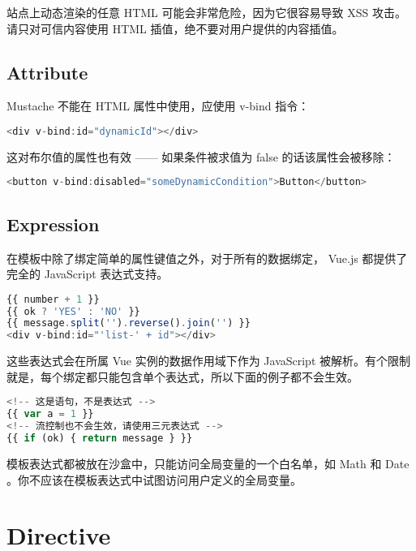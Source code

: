 站点上动态渲染的任意 HTML 可能会非常危险，因为它很容易导致 XSS 攻击。请只对可信内容使用 HTML 插值，绝不要对用户提供的内容插值。




\subsection{Attribute}

Mustache 不能在 HTML 属性中使用，应使用 v-bind 指令：

\begin{lstlisting}[language=JavaScript]
<div v-bind:id="dynamicId"></div>
\end{lstlisting}

这对布尔值的属性也有效 —— 如果条件被求值为 false 的话该属性会被移除：

\begin{lstlisting}[language=JavaScript]
<button v-bind:disabled="someDynamicCondition">Button</button>
\end{lstlisting}





\subsection{Expression}

在模板中除了绑定简单的属性键值之外，对于所有的数据绑定， Vue.js 都提供了完全的 JavaScript 表达式支持。

\begin{lstlisting}[language=JavaScript]
{{ number + 1 }}
{{ ok ? 'YES' : 'NO' }}
{{ message.split('').reverse().join('') }}
<div v-bind:id="'list-' + id"></div>
\end{lstlisting}


这些表达式会在所属 Vue 实例的数据作用域下作为 JavaScript 被解析。有个限制就是，每个绑定都只能包含单个表达式，所以下面的例子都不会生效。

\begin{lstlisting}[language=JavaScript]
<!-- 这是语句，不是表达式 -->
{{ var a = 1 }}
<!-- 流控制也不会生效，请使用三元表达式 -->
{{ if (ok) { return message } }}
\end{lstlisting}


模板表达式都被放在沙盒中，只能访问全局变量的一个白名单，如 Math 和 Date 。你不应该在模板表达式中试图访问用户定义的全局变量。




\section{Directive}

